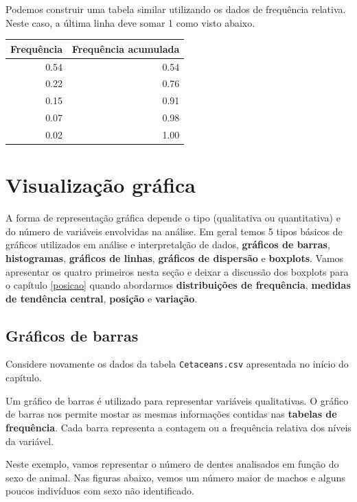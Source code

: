 \documentclass[
]{book}
\begin{document}
Podemos construir uma tabela similar utilizando os dados de frequência relativa. Neste caso, a última linha deve somar 1 como visto abaixo.

\begin{tabular}{r|r}
\hline
Frequência & Frequência acumulada\\
\hline
0.54 & 0.54\\
\hline
0.22 & 0.76\\
\hline
0.15 & 0.91\\
\hline
0.07 & 0.98\\
\hline
0.02 & 1.00\\
\hline
\end{tabular}

\hypertarget{visualizauxe7uxe3o-gruxe1fica}{%
\section{Visualização gráfica}\label{visualizauxe7uxe3o-gruxe1fica}}

A forma de representação gráfica depende o tipo (qualitativa ou quantitativa) e do número de variáveis envolvidas na análise. Em geral temos 5 tipos básicos de gráficos utilizados em análise e interpretalção de dados, \textbf{gráficos de barras}, \textbf{histogramas}, \textbf{gráficos de linhas}, \textbf{gráficos de dispersão} e \textbf{boxplots}. Vamos apresentar os quatro primeiros nesta seção e deixar a discussão dos boxplots para o capítulo \ref{posicao} quando abordarmos \textbf{distribuições de frequência}, \textbf{medidas de tendência central}, \textbf{posição} e \textbf{variação}.

\hypertarget{gruxe1ficos-de-barras}{%
\subsection{Gráficos de barras}\label{gruxe1ficos-de-barras}}

Considere novamente os dados da tabela \texttt{Cetaceans.csv} apresentada no início do capítulo.

Um gráfico de barras é utilizado para representar variáveis qualitativas. O gráfico de barras nos permite mostar as mesmas informações contidas nas \textbf{tabelas de frequência}. Cada barra representa a contagem ou a frequência relativa dos níveis da variável.

Neste exemplo, vamos representar o número de dentes analisados em função do sexo de animal. Nas figuras abaixo, vemos um número maior de machos e alguns poucos indivíduos com sexo não identificado.
\end{document}
